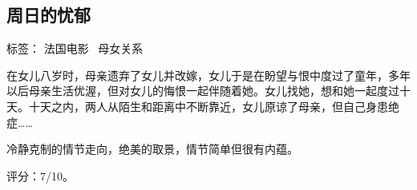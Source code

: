 \subsection{周日的忧郁}

标签： 法国电影 \  母女关系

在女儿八岁时，母亲遗弃了女儿并改嫁，女儿于是在盼望与恨中度过了童年，多年以后母亲生活优渥，但对女儿的悔恨一起伴随着她。女儿找她，想和她一起度过十天。十天之内，两人从陌生和距离中不断靠近，女儿原谅了母亲，但自己身患绝症……

冷静克制的情节走向，绝美的取景，情节简单但很有内蕴。

评分：7/10。